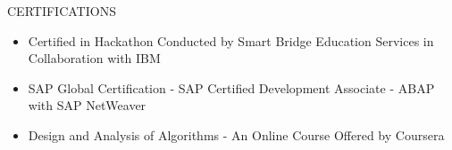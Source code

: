 \documentclass{resume} %
\begin{document}
\begin{rSection}{CERTIFICATIONS}
    \begin{flushleft}
            \begin{itemize}
                    \item Certified in Hackathon Conducted by Smart Bridge Education Services in Collaboration with IBM \\
                    \item SAP Global Certification {-} SAP Certified Development Associate {-} ABAP with SAP NetWeaver \\
                    \item Design and Analysis of Algorithms {-} An Online Course Offered by Coursera \\
                            \end{itemize}
        \end{flushleft}
\end{rSection}
\end{document}
